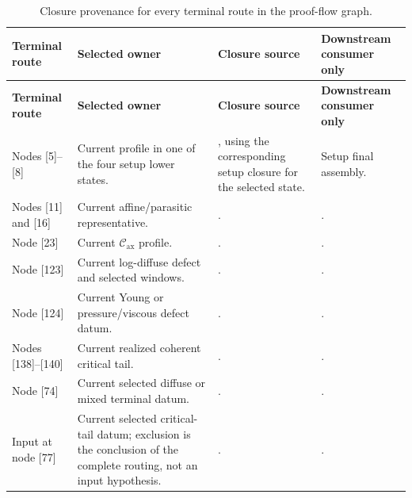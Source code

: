 \documentclass[11pt]{amsart}
\numberwithin{equation}{section}
\theoremstyle{plain}
\theoremstyle{definition}
\theoremstyle{remark}
\newcommand{\Cax}{\mathcal C_{\mathrm{ax}}}
\begin{document}
\begingroup
\scriptsize
\setlength{\tabcolsep}{2pt}
\renewcommand{\arraystretch}{1.16}
\begin{longtable}{@{}L{0.16\textwidth}L{0.25\textwidth}L{0.30\textwidth}L{0.21\textwidth}@{}}
\caption{Closure provenance for every terminal route in the proof-flow graph.}
\label{tab:typeI-proof-flow-branch-closure}\\
\hline
\textbf{Terminal route} & \textbf{Selected owner} &
\textbf{Closure source} & \textbf{Downstream consumer only}\\
\hline
\endfirsthead
\hline
\textbf{Terminal route} & \textbf{Selected owner} &
\textbf{Closure source} & \textbf{Downstream consumer only}\\
\hline
\endhead
\hline
\endfoot
Nodes [5]--[8] & Current profile in one of the four setup lower states. &
, using the
corresponding setup closure for the selected state. &
Setup final assembly.\\
Nodes [11] and [16] & Current affine/parasitic representative. &
. &
.\\
Node [23] & Current \(\Cax\) profile. &
. &
.\\
Node [123] & Current log-diffuse defect and selected windows. &
. &
.\\
Node [124] & Current Young or pressure/viscous defect datum. &
. &
.\\
Nodes [138]--[140] & Current realized coherent critical tail. &
. &
.\\
Node [74] & Current selected diffuse or mixed terminal datum. &
. &
.\\
Input at node [77] & Current selected critical-tail datum; exclusion is the
conclusion of the complete routing, not an input hypothesis. &
. &
.\\

\end{longtable}
\end{document}
